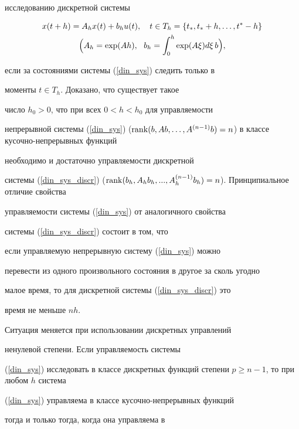 исследованию дискретной системы


\begin{gather}\label{din_sys_discr}


x(t+h) = A_h x(t) + b_h u(t), \quad t \in T_h = \{ t_*, t_*+h, \dotsc,


t^*-h \} \\


%


\Big(A_h = \exp(Ah), \ \ b_{h} = \int_0^h \exp(A\xi)d\xi\,b \Big),\notag


\end{gather}


если за состояниями системы (\ref{din_sys}) следить только в


моменты $t \in T_h$. Доказано, что существует такое


число $h_{0}>0$, что при всех $0<h<h_{0}$ для управляемости


непрерывной системы (\ref{din_sys}) ($\rank (b,Ab,


\dotsc, A^{(n-1)}b) = n$) в классе кусочно-непрерывных функций


необходимо и достаточно управляемости дискретной


системы (\ref{din_sys_discr}) ($\rank (b_h,A_hb_h, ..., A^{(n-


1)}_hb_h) = n$). Принципиальное отличие свойства


управляемости системы (\ref{din_sys}) от аналогичного свойства


системы (\ref{din_sys_discr}) состоит в том, что


если управляемую непрерывную систему (\ref{din_sys}) можно


перевести из одного произвольного состояния в другое за сколь угодно


малое время, то для дискретной системы (\ref{din_sys_discr}) это


время не меньше $nh$.





Ситуация меняется при использовании дискретных управлений


ненулевой степени. Если управляемость системы


(\ref{din_sys}) исследовать в классе дискретных функций степени $p


\geq n-1$, то при любом $h$ система


(\ref{din_sys}) управляема в классе кусочно-непрерывных функций


тогда и только тогда, когда она управляема в


